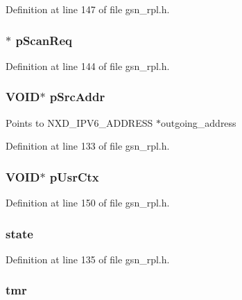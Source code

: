 Definition at line 147 of file gsn\_\-rpl.h.

\hypertarget{a00192_a8cc5c2e4dc3b9767775f934bcb36b98d}{
\subsubsection[{pScanReq}]{$\ast$ {\bf pScanReq}}}
\label{a00192_a8cc5c2e4dc3b9767775f934bcb36b98d}


Definition at line 144 of file gsn\_\-rpl.h.

\hypertarget{a00192_a536c3496528ac97836a945c9207873e2}{
\subsubsection[{pSrcAddr}]{\setlength{\rightskip}{0pt plus 5cm}VOID$\ast$ {\bf pSrcAddr}}}
\label{a00192_a536c3496528ac97836a945c9207873e2}
Points to NXD\_\-IPV6\_\-ADDRESS $\ast$outgoing\_\-address 

Definition at line 133 of file gsn\_\-rpl.h.

\hypertarget{a00192_a69a1fecfdd0530957db9846f92c04766}{
\subsubsection[{pUsrCtx}]{\setlength{\rightskip}{0pt plus 5cm}VOID$\ast$ {\bf pUsrCtx}}}
\label{a00192_a69a1fecfdd0530957db9846f92c04766}


Definition at line 150 of file gsn\_\-rpl.h.

\hypertarget{a00192_a6e9c4cbd32a1178b12f3a61f6855c896}{
\subsubsection[{state}]{ {\bf state}}}
\label{a00192_a6e9c4cbd32a1178b12f3a61f6855c896}


Definition at line 135 of file gsn\_\-rpl.h.

\hypertarget{a00192_a7947cb3f25585c0d1d74f29106585d1d}{
\subsubsection[{tmr}]{ {\bf tmr}}}
\label{a00192_a7947cb3f25585c0d1d74f29106585d1d}


